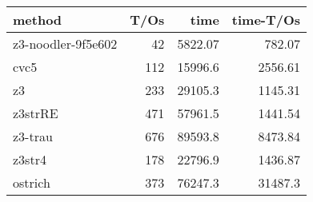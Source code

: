 \begin{tabular}{lrrr}
\hline
 method             &   T/Os &     time &   time-T/Os \\
\hline
 z3-noodler-9f5e602 &     42 &  5822.07 &      782.07 \\
 cvc5               &    112 & 15996.6  &     2556.61 \\
 z3                 &    233 & 29105.3  &     1145.31 \\
 z3strRE            &    471 & 57961.5  &     1441.54 \\
 z3-trau            &    676 & 89593.8  &     8473.84 \\
 z3str4             &    178 & 22796.9  &     1436.87 \\
 ostrich            &    373 & 76247.3  &    31487.3  \\
\hline
\end{tabular}
